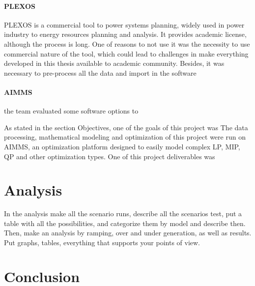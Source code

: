 \documentclass[12pt,LUDisStyle,twosided]{book}
\begin{document}
\subsubsection{PLEXOS \textregistered }

PLEXOS \textregistered is a commercial tool to power systems planning, widely used in power industry to energy resources planning and analysis. It provides academic license, although the process is long. One of reasons to not use it was the necessity to use commercial nature of the tool, which could lead to challenges in make everything developed in this thesis available to academic community. Besides, it was necessary to pre-process all the data and import in the software 


\subsubsection{AIMMS}




the team evaluated some software options to 

As stated in the section Objectives, one of the goals of this project was 
The data processing, mathematical modeling and optimization of this project were run on AIMMS, an optimization platform designed to easily model complex LP, MIP, QP and other optimization types. One of this project deliverables was 


\chapter{Analysis}

In the analysis make all the scenario runs, describe all the scenarios test, put a table with all the possibilities, and categorize them by model and describe then. Then, make an analysis by ramping, over and under generation, as well as results. Put graphs, tables, everything that supports your points of view.

\chapter{Conclusion}

\appendix



\nocite{*}


\end{document}
